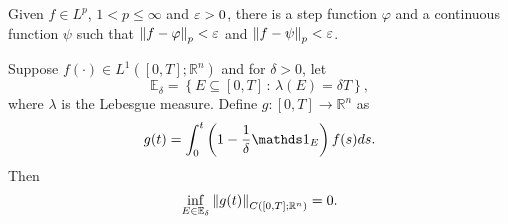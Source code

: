
\begin{proposition}\label{prop6.8}
    Given $f \in L^{p}$, $1 < p \leq \infty$ and $\varepsilon > 0$, there is a step
    function $\varphi$ and a continuous function $\psi$ such that 
    $\left\lVert f - \varphi\right\rVert_{p} < \varepsilon$ and $\left\lVert f - \psi\right\rVert_{p} < \varepsilon$.
\end{proposition}

\begin{lemma}\label{lem:spike}
    Suppose $f(\cdot) \in L^{1}([0,T] ; \mathbb{R}^{n})$ and for $\delta > 0$, let
    $$
        \mathbb{E}_{\delta} = \left \{ E \subseteq [0,T] \, : \, %
            \lambda(E) = \delta T  \right\},
    $$
    where $\lambda$ is the Lebesgue measure. Define $g:[0,T] \to \mathbb{R}^{n}$ as
    $$
        g(t) = \int_{0}^{t}\left(1 - \dfrac{1}{\delta} \ind_{E}\right)%
            f(s) ds.
    $$
    Then
    $$
        \inf_{E \in \mathbb{E}_{\delta} } \norm{g(t)}_{C([0,T] ; %
            \mathbb{R}^{n})} = 0.
    $$
\end{lemma}
